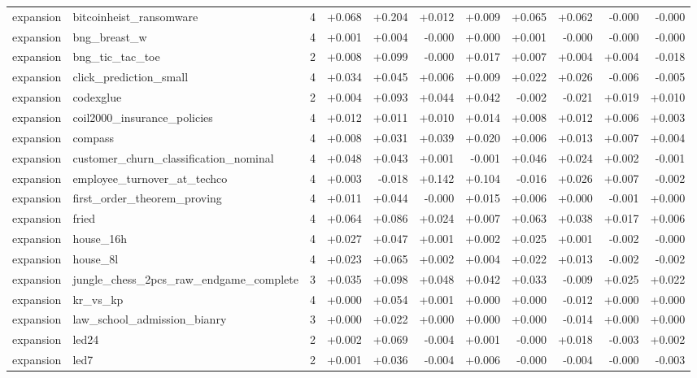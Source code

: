 \begin{longtable}{llr rrrr rrrr}
expansion & bitcoinheist\_ransomware & 4 & +0.068 & +0.204 & +0.012 & +0.009 & +0.065 & +0.062 & -0.000 & -0.000 \\
expansion & bng\_breast\_w & 4 & +0.001 & +0.004 & -0.000 & +0.000 & +0.001 & -0.000 & -0.000 & -0.000 \\
expansion & bng\_tic\_tac\_toe & 2 & +0.008 & +0.099 & -0.000 & +0.017 & +0.007 & +0.004 & +0.004 & -0.018 \\
expansion & click\_prediction\_small & 4 & +0.034 & +0.045 & +0.006 & +0.009 & +0.022 & +0.026 & -0.006 & -0.005 \\
expansion & codexglue & 2 & +0.004 & +0.093 & +0.044 & +0.042 & -0.002 & -0.021 & +0.019 & +0.010 \\
expansion & coil2000\_insurance\_policies & 4 & +0.012 & +0.011 & +0.010 & +0.014 & +0.008 & +0.012 & +0.006 & +0.003 \\
expansion & compass & 4 & +0.008 & +0.031 & +0.039 & +0.020 & +0.006 & +0.013 & +0.007 & +0.004 \\
expansion & customer\_churn\_classification\_nominal & 4 & +0.048 & +0.043 & +0.001 & -0.001 & +0.046 & +0.024 & +0.002 & -0.001 \\
expansion & employee\_turnover\_at\_techco & 4 & +0.003 & -0.018 & +0.142 & +0.104 & -0.016 & +0.026 & +0.007 & -0.002 \\
expansion & first\_order\_theorem\_proving & 4 & +0.011 & +0.044 & -0.000 & +0.015 & +0.006 & +0.000 & -0.001 & +0.000 \\
expansion & fried & 4 & +0.064 & +0.086 & +0.024 & +0.007 & +0.063 & +0.038 & +0.017 & +0.006 \\
expansion & house\_16h & 4 & +0.027 & +0.047 & +0.001 & +0.002 & +0.025 & +0.001 & -0.002 & -0.000 \\
expansion & house\_8l & 4 & +0.023 & +0.065 & +0.002 & +0.004 & +0.022 & +0.013 & -0.002 & -0.002 \\
expansion & jungle\_chess\_2pcs\_raw\_endgame\_complete & 3 & +0.035 & +0.098 & +0.048 & +0.042 & +0.033 & -0.009 & +0.025 & +0.022 \\
expansion & kr\_vs\_kp & 4 & +0.000 & +0.054 & +0.001 & +0.000 & +0.000 & -0.012 & +0.000 & +0.000 \\
expansion & law\_school\_admission\_bianry & 3 & +0.000 & +0.022 & +0.000 & +0.000 & +0.000 & -0.014 & +0.000 & +0.000 \\
expansion & led24 & 2 & +0.002 & +0.069 & -0.004 & +0.001 & -0.000 & +0.018 & -0.003 & +0.002 \\
expansion & led7 & 2 & +0.001 & +0.036 & -0.004 & +0.006 & -0.000 & -0.004 & -0.000 & -0.003 \\

\end{longtable}
